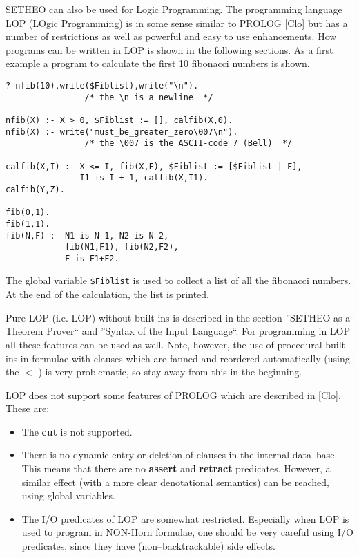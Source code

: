 SETHEO can also be used for Logic Programming. The programming
language LOP (LOgic Programming) is in some sense similar to PROLOG
[Clo] but has a number of restrictions as well as
powerful and easy to
use enhancements.
How programs can be written in LOP is shown in the following
sections. As a first example a program to calculate the first 10
fibonacci numbers is shown.

\begin{verbatim}
?-nfib(10),write($Fiblist),write("\n").
                /* the \n is a newline  */

nfib(X) :- X > 0, $Fiblist := [], calfib(X,0).
nfib(X) :- write("must_be_greater_zero\007\n").
                /* the \007 is the ASCII-code 7 (Bell)  */

calfib(X,I) :- X <= I, fib(X,F), $Fiblist := [$Fiblist | F],
               I1 is I + 1, calfib(X,I1).
calfib(Y,Z).

fib(0,1).
fib(1,1).
fib(N,F) :- N1 is N-1, N2 is N-2,
            fib(N1,F1), fib(N2,F2), 
            F is F1+F2.
\end{verbatim}

The global variable {\tt\$Fiblist} is used to collect a list of all the
fibonacci numbers. At the end of the calculation, the list is printed.

Pure LOP (i.e. LOP) without built-ins is described in the 
section ''SETHEO as a Theorem Prover`` and ''Syntax of the Input Language``.
 For programming in LOP
all these features can be used as well. Note, however, the use
of procedural built--ins in formulae with clauses which
are fanned and reordered automatically (using the $<$-) is very problematic,
so stay away from this in the beginning.

LOP does not support some features of PROLOG which are described in
[Clo].
These are:
\begin{itemize}
\item
The {\bf cut} is not supported.
\item
There is no dynamic entry or deletion of clauses in the internal data--base.
This means that there are no {\bf assert} and {\bf retract} predicates.
However, a similar effect (with a more clear denotational semantics) can
be reached, using global variables.
\item
The I/O predicates of LOP are somewhat restricted. Especially when 
LOP is used to program in NON-Horn formulae, one should be very careful
using I/O predicates, since they have (non--backtrackable) side effects.
\end{itemize}

